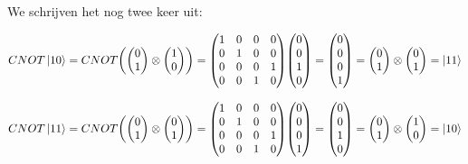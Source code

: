 \documentclass[../main.tex]{subfiles}
\begin{document}
We schrijven het nog twee keer uit:

$
CNOT\ket{10}=CNOT
\mqty(\mqty(0\\1)\otimes\mqty(1\\0))=
\mqty(1&0&0&0\\0&1&0&0\\0&0&0&1\\0&0&1&0)\mqty(0\\0\\1\\0)=
\mqty(0\\0\\0\\1)=\mqty(0\\1)\otimes\mqty(0\\1)=
\ket{11}
$

$
CNOT\ket{11}=CNOT
\mqty(\mqty(0\\1)\otimes\mqty(0\\1))=
\mqty(1&0&0&0\\0&1&0&0\\0&0&0&1\\0&0&1&0)\mqty(0\\0\\0\\1)=
\mqty(0\\0\\1\\0)=
\mqty(0\\1)\otimes\mqty(1\\0)=
\ket{10}$
\end{document}
